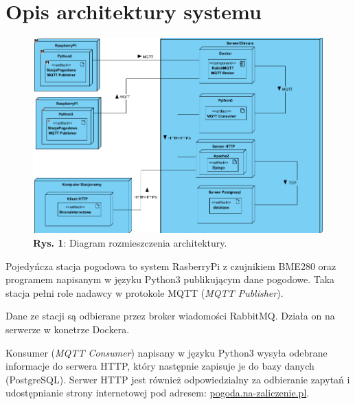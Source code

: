 \documentclass[12pt,a4paper]{article}
\begin{document}
    \pagebreak
    \section{Opis architektury systemu}

    \noindent

    \begin{figure}[ht]
    \centering
    \includegraphics*[scale=0.5]{architektura.png}
    \caption*{\centering \textbf{Rys. 1}: Diagram rozmieszczenia architektury.}
    \end{figure}

    \vspace*{3mm}

    Pojedyńcza stacja pogodowa to system RasberryPi z czujnikiem BME280 oraz programem napisanym w języku Python3 publikującym dane pogodowe. Taka stacja pełni role nadawcy w protokole MQTT (\emph{MQTT Publisher}).

    Dane ze stacji są odbierane przez broker wiadomości RabbitMQ. Działa on na serwerze w konetrze Dockera.

    Konsumer (\emph{MQTT Consumer}) napisany w języku Python3 wysyła odebrane informacje do serwera HTTP, który następnie zapisuje je do bazy danych (PostgreSQL). Serwer HTTP jest również odpowiedzialny za odbieranie zapytań i udostępnianie strony internetowej pod adresem: \href{http://pogoda.na-zaliczenie.pl}{pogoda.na-zaliczenie.pl}.

    \pagebreak
\end{document}
